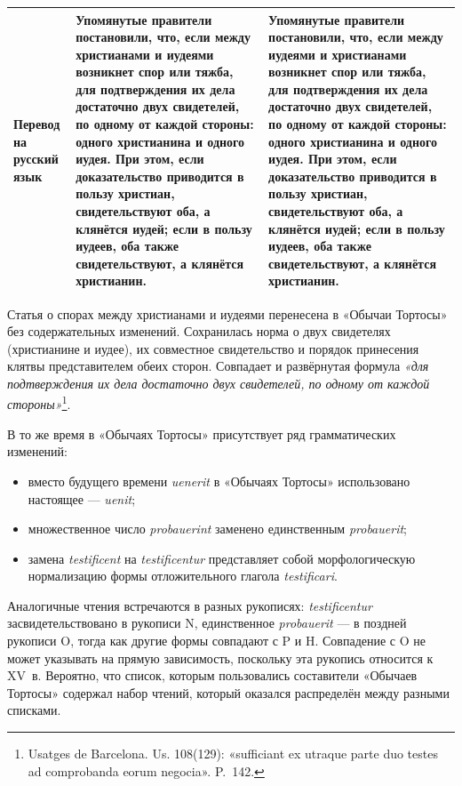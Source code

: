 \begin{center}
\begin{longtable}{|p{}|p{}|p{}|}
\textbf{Перевод на русский язык} & Упомянутые правители постановили, что, если между христианами и иудеями возникнет спор или тяжба, для подтверждения их дела достаточно двух свидетелей, по одному от каждой стороны: одного христианина и одного иудея. При этом, если доказательство приводится в пользу христиан, свидетельствуют оба, а клянётся иудей; если в пользу иудеев, оба также свидетельствуют, а клянётся христианин. & Упомянутые правители постановили, что, если между иудеями и христианами возникнет спор или тяжба, для подтверждения их дела достаточно двух свидетелей, по одному от каждой стороны: одного христианина и одного иудея. При этом, если доказательство приводится в пользу христиан, свидетельствуют оба, а клянётся иудей; если в пользу иудеев, оба также свидетельствуют, а клянётся христианин. \\ \hline
\end{longtable}
\end{center}

Статья о спорах между христианами и иудеями перенесена в «Обычаи Тортосы» без содержательных изменений. Сохранилась норма о двух свидетелях (христианине и иудее), их совместное свидетельство и порядок принесения клятвы представителем обеих сторон. Совпадает и развёрнутая формула \emph{«}\emph{для подтверждения их дела достаточно двух свидетелей, по одному от каждой стороны}\emph{»}\footnote{Usatges de Barcelona. Us. 108(129): «sufficiant ex utraque parte duo testes ad comprobanda eorum negocia». P.~142.}.

В то же время в «Обычаях Тортосы» присутствует ряд грамматических изменений:

\begin{itemize}
\item вместо\textbf{ }будущего времени \emph{u}\emph{enerit} в «Обычаях Тортосы» использовано настоящее --- \emph{u}\emph{enit};
\item множественное число \emph{probauerint} заменено единственным \emph{proba}\emph{u}\emph{erit};
\item замена\emph{ }\emph{testificent}\emph{ }на \emph{testificentur}\emph{ }представляет собой морфологическую нормализацию формы отложительного глагола \emph{testificari}.
\end{itemize}
Аналогичные чтения встречаются в разных рукописях: \emph{testificentur} засвидетельствовано в рукописи N, единственное \emph{probauerit} --- в поздней рукописи O, тогда как другие формы совпадают с P и H. Совпадение с O не может указывать на прямую зависимость, поскольку эта рукопись относится к XV~в. Вероятно, что список, которым пользовались составители «Обычаев Тортосы» содержал набор чтений, который оказался распределён между разными списками.


